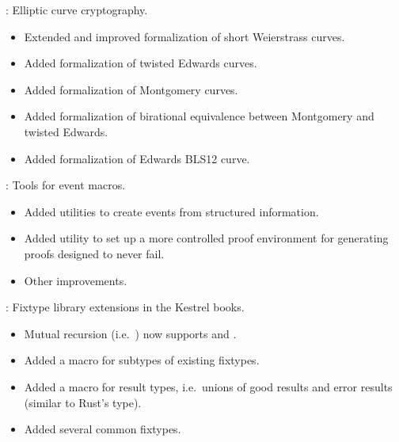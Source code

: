 
\begin{frame}

\implibtitle

:
Elliptic curve cryptography.
\begin{itemize}
\item Extended and improved formalization of short Weierstrass curves.
\item Added formalization of twisted Edwards curves.
\item Added formalization of Montgomery curves.
\item Added formalization of birational equivalence between
      Montgomery and twisted Edwards.
\item Added formalization of Edwards BLS12 curve.
\end{itemize}

\end{frame}


\begin{frame}

\implibtitle

:
Tools for event macros.
\begin{itemize}
\item Added utilities to create events from structured information.
\item Added utility to set up a more controlled proof environment
      for generating proofs designed to never fail.
\item Other improvements.
\end{itemize}

\end{frame}


\begin{frame}

\implibtitle

:
Fixtype library extensions in the Kestrel books.
\begin{itemize}
\item Mutual recursion (i.e.\ )
      now supports  and .
\item Added a macro  for subtypes of existing fixtypes.
\item Added a macro  for result types,
      i.e.\ unions of good results and error results
      (similar to Rust's  type).
\item Added several common fixtypes.
\end{itemize}

\end{frame}

